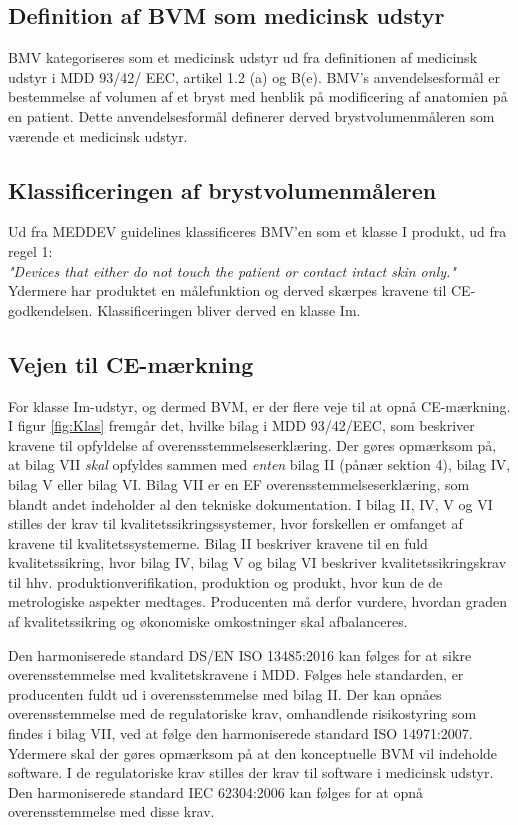 {\subsection{Definition af BVM som medicinsk udstyr}

BMV kategoriseres som et medicinsk udstyr ud fra definitionen af medicinsk udstyr i MDD 93/42/ EEC, artikel 1.2 (a) og B(e). BMV's anvendelsesformål er bestemmelse af volumen af et bryst med henblik på modificering af anatomien på en patient. Dette anvendelsesformål definerer derved brystvolumenmåleren som værende et medicinsk udstyr. 

\subsection{Klassificeringen af brystvolumenmåleren}

Ud fra MEDDEV guidelines klassificeres BMV'en som et klasse I produkt, ud fra regel 1: \\
\textit{"Devices that either do not touch the patient or contact intact skin only."} \\
Ydermere har produktet en målefunktion og derved skærpes kravene til CE-godkendelsen. Klassificeringen bliver derved en klasse Im.

\subsection{Vejen til CE-mærkning}

For klasse Im-udstyr, og dermed BVM, er der flere veje til at opnå CE-mærkning. I figur \ref{fig:Klas} fremgår det, hvilke bilag i MDD 93/42/EEC, som beskriver kravene til opfyldelse af overensstemmelseserklæring. Der gøres opmærksom på, at bilag VII \textit{skal} opfyldes sammen med \textit{enten} bilag II (pånær sektion 4), bilag IV, bilag V eller bilag VI. Bilag VII er en EF overensstemmelseserklæring, som blandt andet indeholder al den tekniske dokumentation. I bilag II, IV, V og VI stilles der krav til kvalitetssikringssystemer, hvor forskellen er omfanget af kravene til kvalitetssystemerne. Bilag II beskriver kravene til en fuld kvalitetssikring, hvor bilag IV, bilag V og bilag VI beskriver kvalitetssikringskrav til hhv. produktionverifikation, produktion og produkt, hvor kun de de metrologiske aspekter medtages. Producenten må derfor vurdere, hvordan graden af kvalitetssikring og økonomiske omkostninger skal afbalanceres.   

    Den harmoniserede standard DS/EN ISO 13485:2016 kan følges for at sikre overensstemmelse med kvalitetskravene i MDD. Følges hele standarden, er producenten fuldt ud i overensstemmelse med bilag II.
    Der kan opnåes overensstemmelse med de regulatoriske krav, omhandlende risikostyring som findes i bilag VII, ved at følge den harmoniserede standard ISO 14971:2007.
Ydermere skal der gøres opmærksom på at den konceptuelle BVM vil indeholde software. I de regulatoriske krav stilles der krav til software i medicinsk udstyr. Den harmoniserede standard IEC 62304:2006 kan følges for at opnå overensstemmelse med disse krav.   


}
